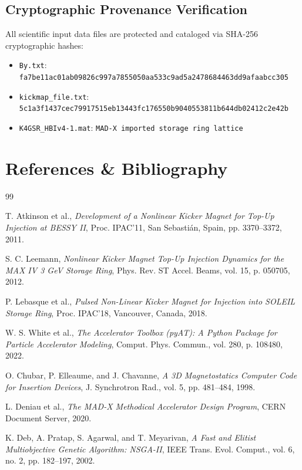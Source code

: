\documentclass[11pt,a4paper]{article}
\begin{document}
\subsection{Cryptographic Provenance Verification}
All scientific input data files are protected and cataloged via SHA-256 cryptographic hashes:
\begin{itemize}
    \item \texttt{By.txt}: \texttt{fa7be11ac01ab09826c997a7855050aa533c9ad5a2478684463dd9afaabcc305}
    \item \texttt{kickmap\_file.txt}: \texttt{5c1a3f1437cec79917515eb13443fc176550b9040553811b644db02412c2e42b}
    \item \texttt{K4GSR\_HBIv4-1.mat}: \texttt{MAD-X imported storage ring lattice}
\end{itemize}

\section{References \& Bibliography}

\begin{thebibliography}{99}

T. Atkinson et al., \emph{Development of a Nonlinear Kicker Magnet for Top-Up Injection at BESSY II}, Proc. IPAC'11, San Sebastián, Spain, pp. 3370--3372, 2011.

S. C. Leemann, \emph{Nonlinear Kicker Magnet Top-Up Injection Dynamics for the MAX IV 3 GeV Storage Ring}, Phys. Rev. ST Accel. Beams, vol. 15, p. 050705, 2012.

P. Lebasque et al., \emph{Pulsed Non-Linear Kicker Magnet for Injection into SOLEIL Storage Ring}, Proc. IPAC'18, Vancouver, Canada, 2018.

W. S. White et al., \emph{The Accelerator Toolbox (pyAT): A Python Package for Particle Accelerator Modeling}, Comput. Phys. Commun., vol. 280, p. 108480, 2022.

O. Chubar, P. Elleaume, and J. Chavanne, \emph{A 3D Magnetostatics Computer Code for Insertion Devices}, J. Synchrotron Rad., vol. 5, pp. 481--484, 1998.

L. Deniau et al., \emph{The MAD-X Methodical Accelerator Design Program}, CERN Document Server, 2020.

K. Deb, A. Pratap, S. Agarwal, and T. Meyarivan, \emph{A Fast and Elitist Multiobjective Genetic Algorithm: NSGA-II}, IEEE Trans. Evol. Comput., vol. 6, no. 2, pp. 182--197, 2002.

\end{thebibliography}
\end{document}
